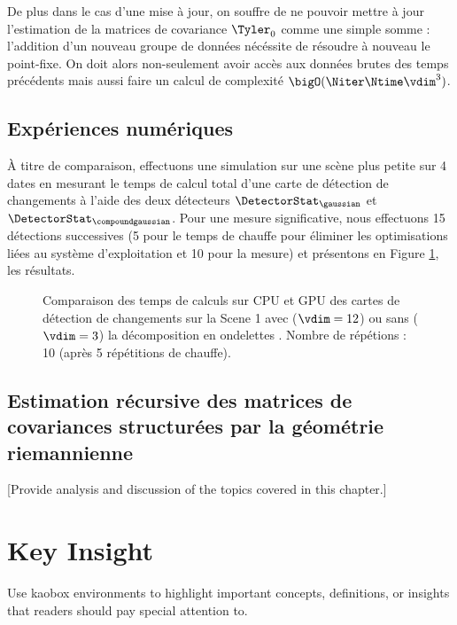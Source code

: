 De plus dans le cas d'une mise à jour, on souffre de ne pouvoir mettre à jour l'estimation de la matrices de covariance $\Tyler_0$ comme une simple somme : l'addition d'un nouveau groupe de données nécéssite de résoudre à nouveau le point-fixe. On doit alors non-seulement avoir accès aux données brutes des temps précédents mais aussi faire un calcul de complexité $\bigO(\Niter\Ntime\vdim^3)$.

\subsection{Expériences numériques}

À titre de comparaison, effectuons une simulation sur une scène plus petite sur 4 dates en mesurant le temps de calcul total d'une carte de détection de changements à l'aide des deux détecteurs $\DetectorStat_\gaussian$ et $\DetectorStat_\compoundgaussian$. Pour une mesure significative, nous effectuons 15 détections successives (5 pour le temps de chauffe pour éliminer les optimisations liées au système d'exploitation et 10 pour la mesure) et présentons en Figure \ref{fig:benchmark_sar_offline}, les résultats.

\begin{figure}[h]
  
  
  \caption{Comparaison des temps de calculs sur CPU et GPU des cartes de détection de changements sur la Scene 1 avec ($\vdim=12$) ou sans ($\vdim=3$) la décomposition en ondelettes \cite{Mian_wavelet_2019}. Nombre de répétions : 10 (après 5 répétitions de chauffe).}
  \label{fig:benchmark_sar_offline}
\end{figure}



\subsection{Estimation récursive des matrices de covariances structurées par la géométrie riemannienne}

[Provide analysis and discussion of the topics covered in this chapter.]

\section*{Key Insight}
Use kaobox environments to highlight important concepts, definitions, or insights that readers should pay special attention to.

